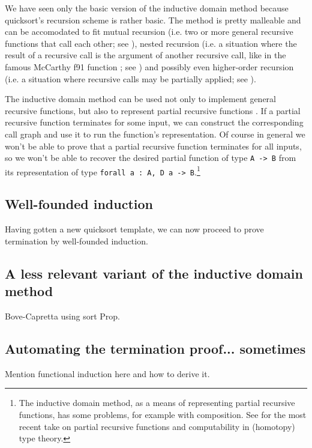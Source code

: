 \documentclass[declaration,mgr,english,shortabstract]{iithesis}
\newcommand{\m}[1]{\texttt{#1}}
\begin{document}
We have seen only the basic version of the inductive domain method because quicksort's recursion scheme is rather basic. The method is pretty malleable and can be accomodated to fit mutual recursion (i.e. two or more general recursive functions that call each other; see \cite{BCM3}), nested recursion (i.e. a situation where the result of a recursive call is the argument of another recursive call, like in the famous McCarthy f91 function \cite{f91}; see \cite{BCM2}) and possibly even higher-order recursion (i.e. a situation where recursive calls may be partially applied; see \cite{BCM6}).

The inductive domain method can be used not only to implement general recursive functions, but also to represent partial recursive functions \cite{BCM8}. If a partial recursive function terminates for some input, we can construct the corresponding call graph and use it to run the function's representation. Of course in general we won't be able to prove that a partial recursive function terminates for all inputs, so we won't be able to recover the desired partial function of type \m{A -> B} from its representation of type \m{forall a\ :\ A, D a -> B}.\footnote{The inductive domain method, as a means of representing partial recursive functions, has some problems, for example with composition. See \cite{Knapp} for the most recent take on partial recursive functions and computability in (homotopy) type theory.}

\subsection{Well-founded induction}

Having gotten a new quicksort template, we can now proceed to prove termination by well-founded induction.

\subsection{A less relevant variant of the inductive domain method} \label{lessrelevant}

Bove-Capretta using sort Prop.

\subsection{Automating the termination proof... sometimes}

Mention functional induction here and how to derive it.
\end{document}
